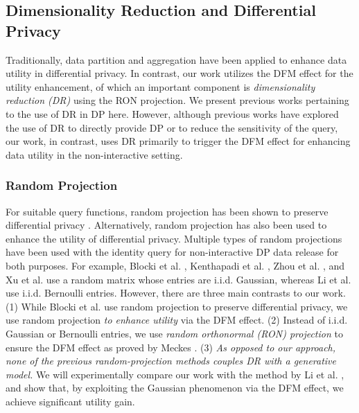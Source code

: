 \documentclass[USenglish,oneside,twocolumn]{article}
\theoremstyle{definition}
\theoremstyle{remark}
\theoremstyle{plain}
\theoremstyle{plain}
\begin{document}
\vspace{-0.5em}
\subsection{Dimensionality Reduction and Differential Privacy}

\label{subsed:dim_for_improve_utility} 
Traditionally, data partition
and aggregation \cite{RefWorks:241,RefWorks:242,RefWorks:243,RefWorks:244,RefWorks:245,RefWorks:246,RefWorks:247,RefWorks:248,RefWorks:193,RefWorks:253,RefWorks:187,RefWorks:221,RefWorks:236,RefWorks:237}
have been applied to enhance data utility in differential
privacy. In contrast, our work utilizes the DFM effect for the utility enhancement, of which an important component is \emph{dimensionality reduction (DR)} using the RON projection.  We present previous works pertaining to the use of DR in DP here. However, although previous works have explored the use of DR to directly provide DP or to reduce the sensitivity of the query, our work, in contrast, uses DR primarily to trigger the DFM effect for enhancing data utility in the non-interactive setting.



\vspace{-1em}
\subsubsection{Random Projection}

For suitable query functions, random projection
has been shown to preserve differential privacy \cite{RefWorks:313,RefWorks:398,RefWorks:399}. Alternatively, random projection has also been used to enhance the utility of differential privacy. Multiple types
of random projections have been used with the identity query for non-interactive
DP data release for both purposes. For example, Blocki et al. \cite{RefWorks:313},
Kenthapadi et al. \cite{RefWorks:314}, Zhou et al. \cite{RefWorks:338},
and Xu et al. \cite{RefWorks:400} use a random matrix whose entries
are i.i.d. Gaussian, whereas Li et al. \cite{RefWorks:337} use i.i.d. Bernoulli
entries. However, there are three main
contrasts to our work. (1) While Blocki et al. \cite{RefWorks:313}
use random projection to preserve differential privacy, we use random projection\emph{
to enhance utility} via the DFM effect. (2) Instead of i.i.d. Gaussian or Bernoulli
entries, we use \emph{random
orthonormal (RON) projection} to ensure the DFM effect as proved by
Meckes \cite{RefWorks:439}. (3) \emph{As opposed to our approach,
none of the previous random-projection methods couples DR with a generative
model.} We will experimentally compare our work with the method by Li et al. \cite{RefWorks:337}, and show that, by exploiting
the Gaussian phenomenon via the DFM effect, we achieve significant
utility gain.
\end{document}
